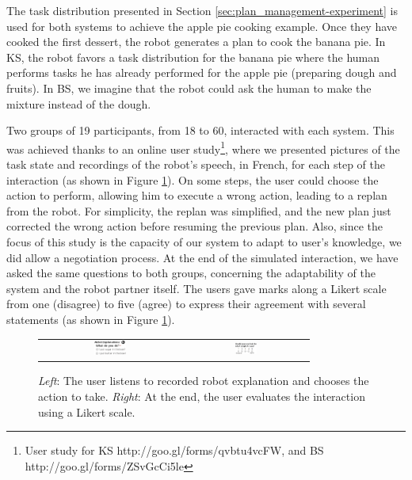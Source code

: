 The task distribution presented in Section \ref{sec:plan_management-experiment} 
is used for both systems to achieve the apple pie cooking example.
Once they have cooked the first dessert, the robot generates a plan to cook the banana pie. 
In KS,  the robot  favors a task distribution for the banana pie where the human performs tasks he has already performed for the apple pie (preparing dough and fruits).
In BS, we imagine that the robot could ask the human to make the mixture instead of the dough.

Two groups of 19 participants, from 18 to 60, interacted with each system. This was achieved thanks to  
an online user study\footnote{User study for KS http://goo.gl/forms/qvbtu4vcFW, and BS http://goo.gl/forms/ZSvGcCi5le}, where we presented pictures of the task state and recordings of the robot's speech, in French, for each step of the interaction (as shown in Figure \ref{fig:plan_management-user_study}).
On some steps, the user could choose the action to perform, allowing him to execute a wrong action, leading to a replan from the robot. For simplicity, the replan was simplified, and the new plan just corrected the wrong action before resuming the previous plan. Also, since the focus of this study is the capacity of our system to adapt to user's knowledge, we did allow a negotiation process.
At the end of the simulated interaction, we have asked the same questions to both groups, concerning the adaptability of the system and the robot partner itself. 
The users gave marks along a Likert scale from one (disagree) to five (agree) to express their agreement with several statements (as shown in Figure \ref{fig:plan_management-user_study}).

\begin{figure}[ht!]
 \centering
 \begin{tabular}{cc}
  \includegraphics[width=0.24\textwidth]{img/plan_management/ustudy9.png} &
  \includegraphics[width=0.19\textwidth]{img/plan_management/ustudy11.png}
 \end{tabular}
  \vspace{-6pt}
 \caption{\textit{Left}: The user listens to recorded robot explanation and chooses the action to take. \textit{Right}: At the end, the user evaluates the interaction using a Likert scale.}
 \label{fig:plan_management-user_study}
 \end{figure}

